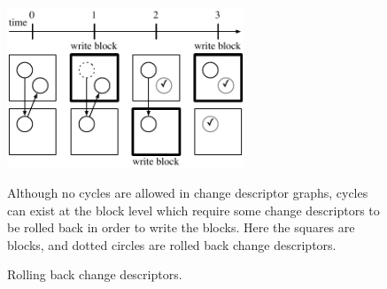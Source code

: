 \begin{figure}
  \centering
  \includegraphics[width=200pt]{rollback_sequence}
  \caption{\label{fig:rollback} Rolling back change descriptors.}{Although no
  cycles are allowed in change descriptor graphs, cycles can exist at the block
  level which require some change descriptors to be rolled back in order to
  write the blocks. Here the squares are blocks, and dotted circles are rolled
  back change descriptors.
}
\end{figure}
